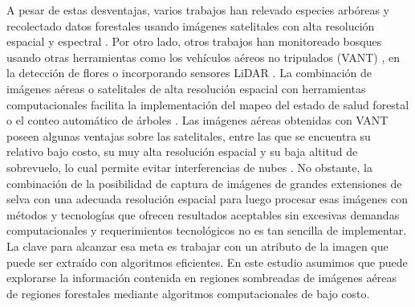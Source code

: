 A pesar de estas desventajas, varios trabajos han relevado especies arbóreas y recolectado datos forestales usando imágenes satelitales con alta resolución espacial y espectral \cite{gomes_detection_nodate,cross_classification_2019,abd_latif_determination_2012,ferreira_tree_2019,radoux_quantitative_2007}. Por otro lado, otros trabajos han monitoreado bosques usando otras herramientas como los vehículos aéreos no tripulados (VANT) \cite{albuquerque_remotely_2020,albuquerque_forest_2021,qin_individual_2022,machida_modeling_2022}, en la detección de flores \cite{campbell_simple_2018} o incorporando sensores LiDAR \cite{terryn_quantifying_2022,brede_non-destructive_2022}. La combinación de imágenes aéreas o satelitales de alta resolución espacial con herramientas computacionales facilita la implementación del mapeo del estado de salud forestal \cite{prost_discrimination_2008} o el conteo automático de árboles \cite{putra_automatic_2023}. Las imágenes aéreas obtenidas con VANT poseen algunas ventajas sobre las satelitales, entre las que se encuentra su relativo bajo costo, su muy alta resolución espacial y su baja altitud de sobrevuelo, lo cual permite evitar interferencias de nubes \cite{alexander_locating_2018,ahmad_aerial_2010,zhang_seeing_2016,ahmad_digital_2013,colomina_unmanned_2014,eisenbeiss_mini_nodate}. No obstante, la combinación de la posibilidad de captura de imágenes de grandes extensiones de selva con una adecuada resolución espacial para luego procesar esas imágenes con métodos y tecnologías que ofrecen resultados aceptables sin excesivas demandas computacionales y requerimientos tecnológicos no es tan sencilla de implementar. La clave para alcanzar esa meta es trabajar con un atributo de la imagen que puede ser extraído con algoritmos eficientes. En este estudio asumimos que puede explorarse la información contenida en regiones sombreadas de imágenes aéreas de regiones forestales mediante algoritmos computacionales de bajo costo.
